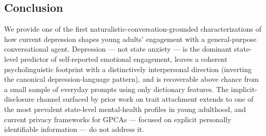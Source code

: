 \documentclass[letterpaper]{article}
\begin{document}
\subsection{Conclusion}

We provide one of the first naturalistic-conversation-grounded characterizations of how current depression shapes young adults' engagement with a general-purpose conversational agent. Depression --- not state anxiety --- is the dominant state-level predictor of self-reported emotional engagement, leaves a coherent psycholinguistic footprint with a distinctively interpersonal direction (inverting the canonical depression-language pattern), and is recoverable above chance from a small sample of everyday prompts using only dictionary features. The implicit-disclosure channel surfaced by prior work on trait attachment \citep{anon2026attachment} extends to one of the most prevalent state-level mental-health profiles in young adulthood, and current privacy frameworks for GPCAs --- focused on explicit personally identifiable information --- do not address it.



\end{document}
